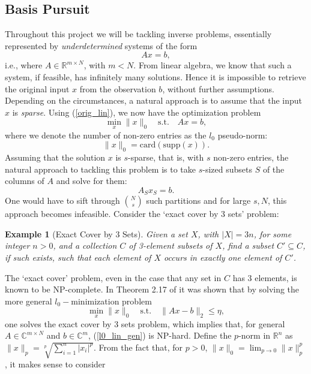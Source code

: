 \documentclass[11pt, twoside]{report}
\newtheorem{example}[theorem]{Example}
\begin{document}
\subsection{Basis Pursuit}
Throughout this project we will be tackling inverse problems, essentially represented by \textit{underdetermined} systems of the form
\begin{equation} \label{orig_lin}
    Ax = b,
\end{equation}
i.e., where $A \in \mathbb{R}^{m \times N}$, with $m<N.$ From linear algebra, we know that such a system, if feasible, has infinitely many solutions. Hence it is impossible to retrieve the original input $x$ from the observation $b$, without further assumptions. Depending on the circumstances, a natural approach is to assume that the input $x$ is \textit{sparse}. Using (\ref{orig_lin}), we now have the optimization problem
\begin{equation} \label{l0_lin}
    \min_x \|x\|_0 \quad \text{s.t.} \quad Ax = b,
\end{equation}
where we denote the number of non-zero entries as the $l_0$ pseudo-norm:
\[\|x\|_0 = \text{card}(\text{supp}(x)).\]
Assuming that the solution $x$ is $s$-sparse, that is, with $s$ non-zero entries, the natural approach to tackling this problem is to take $s$-sized subsets $S$ of the columns of $A$ and solve for them:
$$A_S x_S = b.$$
One would have to sift through ${N \choose s}$ such partitions and for large $s,N$, this approach becomes infeasible. Consider the `exact cover by 3 sets' problem:
\begin{example}[Exact Cover by 3 Sets]
Given a set $X$, with $|X| = 3n$, for some integer $n>0$, and a collection $C$ of 3-element subsets of $X$, find a subset $C' \subseteq C$, if such exists, such that each element of $X$ occurs in exactly one element of $C'$.
\end{example}
The `exact cover' problem, even in the case that any set in $C$ has 3 elements, is known to be NP-complete. In Theorem 2.17 of \cite{anha} it was shown that by solving the more general $l_0-$minimization problem
\begin{equation} \label{l0_lin_gen}
    \min_x \|x\|_0 \quad \text{s.t.} \quad \|Ax-b\|_2 \leq \eta,
\end{equation}
one solves the exact cover by 3 sets problem, which implies that, for general $A \in \mathbb{C}^{m \times N}$ and $ b \in \mathbb{C}^{m}$, (\ref{l0_lin_gen}) is NP-hard. Define the $p$-norm in $\mathbb{R}^n$ as $\|x\|_p = \sqrt[p]{\sum_{i=1}^n |x_i|^p}$. From the fact that, for $p>0$, $\|x\|_0 = \lim_{p \xrightarrow[]{} 0} \|x\|_p^p$, it makes sense to consider
\end{document}
